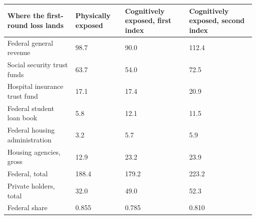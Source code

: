 \setlength{\tabcolsep}{4pt}
\begin{tabular}{p{4.8cm}p{2.2cm}p{2.5cm}p{2.5cm}}
\toprule
Where the first-round loss lands & Physically exposed & Cognitively exposed, first index & Cognitively exposed, second index \\
\midrule
Federal general revenue & 98.7 & 90.0 & 112.4 \\
Social security trust funds & 63.7 & 54.0 & 72.5 \\
Hospital insurance trust fund & 17.1 & 17.4 & 20.9 \\
Federal student loan book & 5.8 & 12.1 & 11.5 \\
Federal housing administration & 3.2 & 5.7 & 5.9 \\
Housing agencies, gross & 12.9 & 23.2 & 23.9 \\
Federal, total & 188.4 & 179.2 & 223.2 \\
Private holders, total & 32.0 & 49.0 & 52.3 \\
Federal share & 0.855 & 0.785 & 0.810 \\
\bottomrule
\end{tabular}

